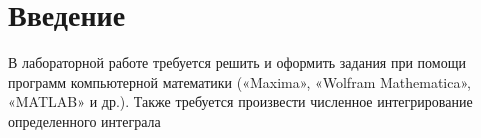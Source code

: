 \section{Введение}
В лабораторной работе требуется решить и оформить задания при помощи программ компьютерной математики («Maxima», «Wolfram Mathematica», «MATLAB» и др.). Также требуется произвести численное интегрирование  определенного интеграла

